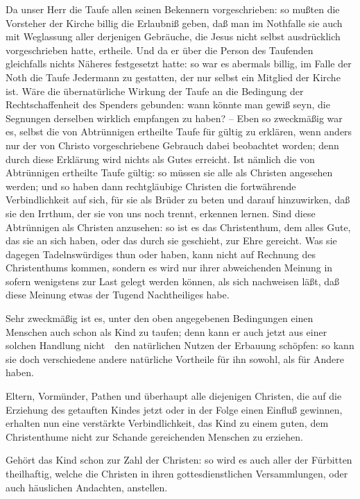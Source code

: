 \begin{aufza}
\item Da unser Herr die Taufe allen seinen Bekennern vorgeschrieben: so mußten die Vorsteher der Kirche billig die Erlaubniß geben, daß man im Nothfalle sie auch mit Weglassung aller derjenigen Gebräuche, die Jesus nicht selbst ausdrücklich vorgeschrieben hatte, ertheile. Und da er über die Person des Taufenden gleichfalls nichts Näheres festgesetzt hatte: so war es abermals billig, im Falle der Noth die Taufe Jedermann zu gestatten, der nur selbst ein Mitglied der Kirche ist. Wäre die übernatürliche Wirkung der Taufe an die Bedingung der Rechtschaffenheit des Spenders gebunden: wann könnte man gewiß seyn, die Segnungen derselben wirklich empfangen zu haben? -- Eben so zweckmäßig war es, selbst die von Abtrünnigen ertheilte Taufe für gültig zu erklären, wenn anders nur der von Christo vorgeschriebene Gebrauch dabei beobachtet worden; denn durch diese Erklärung wird nichts als Gutes erreicht. Ist nämlich die von Abtrünnigen ertheilte Taufe gültig: so müssen sie alle als Christen angesehen werden; und so haben dann rechtgläubige Christen die fortwährende Verbindlichkeit auf sich, für sie als Brüder zu beten und darauf hinzuwirken, daß sie den Irrthum, der sie von uns noch trennt, erkennen lernen. Sind diese Abtrünnigen als Christen anzusehen: so ist es das Christenthum, dem alles Gute, das sie an sich haben, oder das durch sie geschieht, zur Ehre gereicht. Was sie dagegen Tadelnswürdiges thun oder haben, kann nicht auf Rechnung des Christenthums kommen, sondern es wird nur ihrer abweichenden Meinung in sofern wenigstens zur Last gelegt werden können, als sich nachweisen läßt, daß diese Meinung etwas der Tugend Nachtheiliges habe.
\item Sehr zweckmäßig ist es, unter den oben angegebenen Bedingungen einen Menschen auch schon als Kind zu taufen; denn kann er auch jetzt aus einer solchen Handlung nicht~\ den natürlichen Nutzen der Erbauung schöpfen: so kann sie doch verschiedene andere natürliche Vortheile für ihn sowohl, als für Andere haben.
\begin{aufzb}
\item Eltern, Vormünder, Pathen und überhaupt alle diejenigen Christen, die auf die Erziehung des getauften Kindes jetzt oder in der Folge einen Einfluß gewinnen, erhalten nun eine verstärkte Verbindlichkeit, das Kind zu einem guten, dem Christenthume nicht zur Schande gereichenden Menschen zu erziehen.
\item Gehört das Kind schon zur Zahl der Christen: so wird es auch aller der Fürbitten theilhaftig, welche die Christen in ihren gottesdienstlichen Versammlungen, oder auch häuslichen Andachten, anstellen.

\end{aufzb}
\end{aufza}
